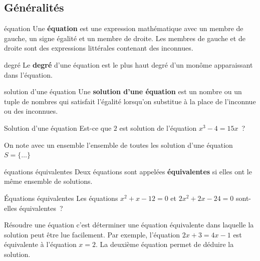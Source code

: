 \documentclass[a4paper,12pt]{article}
\begin{document}
\subsection{Généralités}
\begin{definition}
	équation
	\tcblower
	Une {\bfseries équation} est une expression mathématique avec un membre de gauche, un signe égalité et un membre de droite. Les membres de gauche et de droite sont des expressions littérales contenant des inconnues.
	\begin{center}
\end{center}
\end{definition}
\begin{definition}
	degré
	\tcblower
	Le {\bfseries degré} d'une équation est le plus haut degré d'un monôme apparaissant dans l'équation.
\end{definition}
\begin{definition}
	solution d'une équation
	\tcblower
	Une {\bfseries solution d'une équation} est un nombre ou un tuple de nombres qui satisfait l'égalité lorsqu'on substitue à la place de l'inconnue ou des inconnues.
\end{definition}
\begin{exemple}
	Solution d'une équation
	\tcblower
	Est-ce que $2$ est solution de l'équation $x^3-4=15x$~?
\vspace{5.8cm}

\end{exemple}
On note avec un ensemble l'ensemble de toutes les solution d'une équation $S=\{\ldots\}$ 
\begin{definition}
	équations équivalentes
	\tcblower
	Deux équations sont appelées {\bfseries équivalentes} si elles ont le même ensemble de solutions. 
\end{definition}
\begin{exemple}
	Équations équivalentes
	\tcblower
	Les équations $x^2+x-12=0$ et $2x^2+2x-24=0$ sont-elles équivalentes~?
\vspace{4cm}

\end{exemple}
Résoudre une équation c'est déterminer une équation équivalente dans laquelle la solution peut être lue facilement. Par exemple, l'équation $2x+3=4x-1$ est équivalente à l'équation $x=2$. La deuxième équation permet de déduire la solution.
\end{document}
